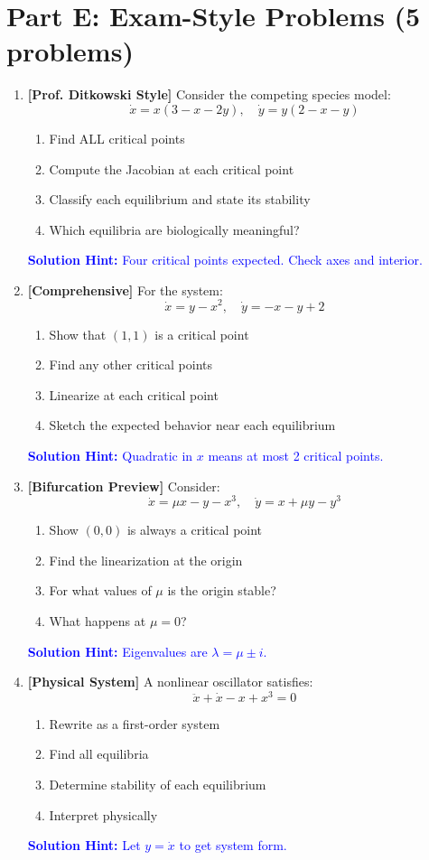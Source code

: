 \documentclass[12pt]{article}
\newcommand{\solution}[1]{\textcolor{blue}{\textbf{Solution Hint:} #1}}
\begin{document}
\section*{Part E: Exam-Style Problems (5 problems)}

\begin{enumerate}[resume]
\item \textbf{[Prof. Ditkowski Style]} Consider the competing species model:
$$\dot{x} = x(3 - x - 2y), \quad \dot{y} = y(2 - x - y)$$
\begin{enumerate}[label=(\alph*)]
    \item Find ALL critical points
    \item Compute the Jacobian at each critical point
    \item Classify each equilibrium and state its stability
    \item Which equilibria are biologically meaningful?
\end{enumerate}
\solution{Four critical points expected. Check axes and interior.}

\item \textbf{[Comprehensive]} For the system:
$$\dot{x} = y - x^2, \quad \dot{y} = -x - y + 2$$
\begin{enumerate}[label=(\alph*)]
    \item Show that $(1, 1)$ is a critical point
    \item Find any other critical points
    \item Linearize at each critical point
    \item Sketch the expected behavior near each equilibrium
\end{enumerate}
\solution{Quadratic in $x$ means at most 2 critical points.}

\item \textbf{[Bifurcation Preview]} Consider:
$$\dot{x} = \mu x - y - x^3, \quad \dot{y} = x + \mu y - y^3$$
\begin{enumerate}[label=(\alph*)]
    \item Show $(0,0)$ is always a critical point
    \item Find the linearization at the origin
    \item For what values of $\mu$ is the origin stable?
    \item What happens at $\mu = 0$?
\end{enumerate}
\solution{Eigenvalues are $\lambda = \mu \pm i$.}

\item \textbf{[Physical System]} A nonlinear oscillator satisfies:
$$\ddot{x} + \dot{x} - x + x^3 = 0$$
\begin{enumerate}[label=(\alph*)]
    \item Rewrite as a first-order system
    \item Find all equilibria
    \item Determine stability of each equilibrium
    \item Interpret physically
\end{enumerate}
\solution{Let $y = \dot{x}$ to get system form.}


\end{enumerate}
\end{document}

